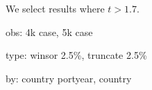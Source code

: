 

\usepackage[T1]{fontenc}




\thispagestyle{fancy}

\newcommand{\code}{\texttt}
\newcommand*{\Commonpath}{20190327}

We select results where $t > 1.7$.

obs: 4k case, 5k case

type: winsor 2.5\%, truncate 2.5\%

by: country portyear, country






